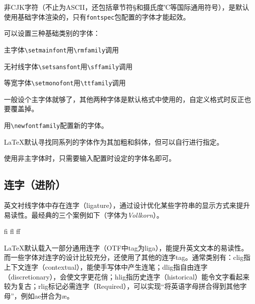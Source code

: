 \documentclass[10pt,openany]{book}
\begin{document}
非CJK字符（不止为ASCII，还包括章节符{\S}和摄氏度{\tempfont ℃}等国际通用符号），是默认使用基础字体渲染的，只有\texttt{fontspec}包配置的字体才能起效。



可以设置三种基础类别的字体：

\begin{tightitem}
    \item 主字体\texttt{\textbackslash{}setmainfont}用\texttt{\textbackslash{}rmfamily}调用
    \item 无衬线字体\texttt{\textbackslash{}setsansfont}用\texttt{\textbackslash{}sffamily}调用
    \item 等宽字体\texttt{\textbackslash{}setmonofont}用\texttt{\textbackslash{}ttfamily}调用
\end{tightitem}

一般设个主字体就够了，其他两种字体是默认格式中使用的，自定义格式时反正也要覆盖掉。

用\texttt{\textbackslash{}newfontfamily}配置新的字体。



{\LaTeX}默认寻找同系列的字体作为其加粗和斜体，但可以自行进行指定。



使用非主字体时，只需要输入配置时设定的字体名即可。



\subsection{连字（进阶）}

英文衬线字体中存在连字（ligature），通过设计优化某些字符串的显示方式来提升易读性。最经典的三个案例如下（字体为\textit{Vollkorn}）。

\begin{minipage}[c][3\baselineskip]{30\ccwd}
    \centering{}\Huge fi fl ff
\end{minipage}

{\LaTeX}默认载入一部分通用连字（OTF中tag为liga），能提升英文文本的易读性。而一些字体对连字的设计比较充分，还使用了其他的连字tag。通常类别有：clig指上下文连字（contextual），能使手写体中产生连笔；dlig指自由连字（discretionary），会使文字更花俏；hlig指历史连字（historical）能令文字看起来较为复古；rlig标记必需连字（Required），可以实现“将英语字母拼合得到其他字母”，例如ae拼合为æ。
\end{document}
